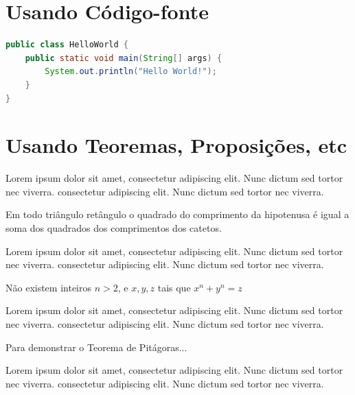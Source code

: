 \lipsum[9]

\section{Usando Código-fonte}

\lipsum[10]



\lipsum[11]

\begin{lstlisting}[language=Java,caption={Hello World em Java}]
public class HelloWorld {
	public static void main(String[] args) {
		System.out.println("Hello World!");
	}
}
\end{lstlisting}

\lipsum[11]

\section{Usando Teoremas, Proposições, etc}

Lorem ipsum dolor sit amet, consectetur adipiscing elit. Nunc dictum sed tortor nec viverra. consectetur adipiscing elit. Nunc dictum sed tortor nec viverra.

\begin{teo}[Pitágoras]
	Em todo triângulo retângulo o quadrado do comprimento da
	hipotenusa é igual a soma dos quadrados dos comprimentos dos catetos.
\end{teo}


Lorem ipsum dolor sit amet, consectetur adipiscing elit. Nunc dictum sed tortor nec viverra. consectetur adipiscing elit. Nunc dictum sed tortor nec viverra.

\begin{teo}[Fermat]
	Não existem inteiros $n > 2$, e $x, y, z$ tais que $x^n + y^n = z$
\end{teo}

Lorem ipsum dolor sit amet, consectetur adipiscing elit. Nunc dictum sed tortor nec viverra. consectetur adipiscing elit. Nunc dictum sed tortor nec viverra.

\begin{prop}
	Para demonstrar o Teorema de Pitágoras...
\end{prop}

Lorem ipsum dolor sit amet, consectetur adipiscing elit. Nunc dictum sed tortor nec viverra. consectetur adipiscing elit. Nunc dictum sed tortor nec viverra.

